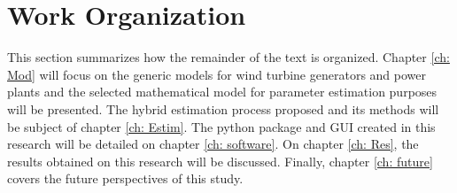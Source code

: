 \section{Work Organization}

This section summarizes how the remainder of the text is organized. Chapter \ref{ch: Mod} will focus on the generic models for wind turbine generators and power plants and the selected mathematical model for parameter estimation purposes will be presented. The hybrid estimation process proposed and its methods will be subject of chapter \ref{ch: Estim}. The python package and GUI created in this research will be detailed on chapter \ref{ch: software}. On chapter \ref{ch: Res}, the results obtained on this research will be discussed. Finally, chapter \ref{ch: future} covers the future perspectives of this study.